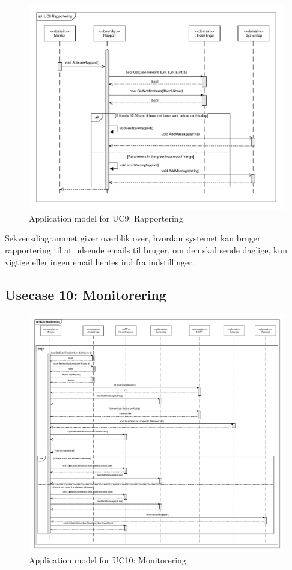 \begin{figure}[!h]
\centering 
\includegraphics[width={\textwidth}, trim=0 0 0 0, clip=true] {../fig/SD_autoGreen_UC_9_Rapportering.pdf}
\caption{Application model for UC9: Rapportering}
\label{fig:SD_UC9}
\end{figure}

Sekvensdiagrammet giver overblik over, hvordan systemet kan bruger rapportering til at udsende emails til bruger, om den skal sende daglige, kun vigtige eller ingen email hentes ind fra indstillinger.

\clearpage

\subsection{Usecase 10: Monitorering}

\begin{figure}[!h]
\centering 
\includegraphics[width={\textwidth}, trim=0 0 0 0, clip=true] {../fig/SD_autoGreen_UC_10.pdf}
\caption{Application model for UC10: Monitorering}
\label{fig:SD_UC10}
\end{figure}

